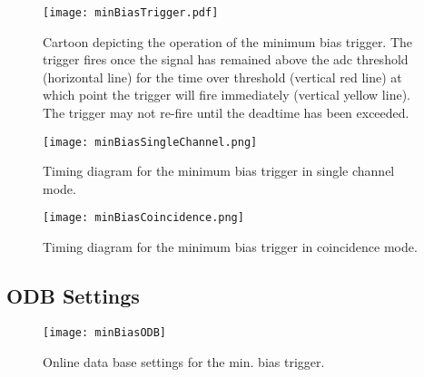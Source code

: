 \begin{figure}[ht]
\centering
\texttt{[image: minBiasTrigger.pdf]}
\caption{Cartoon depicting the operation of the minimum bias trigger. The trigger fires once the signal has remained above the adc threshold (horizontal line) for the time over threshold (vertical red line) at which point the trigger will fire immediately (vertical yellow line). The trigger may not re-fire until the deadtime has been exceeded.}
\label{Fig:minBiasTrigger}
\end{figure}


\begin{landscape}
	\vspace*{\fill}
	\begin{figure}[ht]
	\centering
	\texttt{[image: minBiasSingleChannel.png]}
	\caption{Timing diagram for the minimum bias trigger in single channel mode.}
	\label{Fig:minBiasSingleSim}
	\end{figure}
	\vspace*{\fill}
\end{landscape}

\begin{landscape}
\vspace*{\fill}
	\begin{figure}[ht]
	\centering
	\texttt{[image: minBiasCoincidence.png]}
	\caption{Timing diagram for the minimum bias trigger in coincidence mode.}
	\label{Fig:minBiasCoincSim}
	\end{figure}
\vspace*{\fill}
\end{landscape}

\subsection{ODB Settings}
\label{sec:minBiasODB}
\begin{figure}[ht]
\centering
\texttt{[image: minBiasODB]}
\caption{Online data base settings for the min. bias trigger.}
\label{Fig:minBiasODB}
\end{figure}

